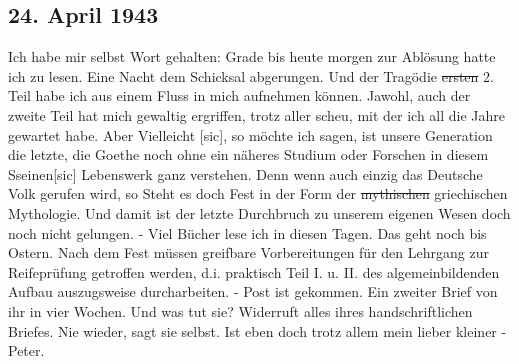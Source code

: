 \subsection{24. April 1943}

Ich habe mir selbst Wort gehalten: Grade bis heute morgen zur Abl\"{o}sung hatte ich zu lesen.
Eine Nacht dem Schicksal abgerungen.
Und der Trag\"{o}die \st{ersten} 2. Teil habe ich aus einem Fluss in mich aufnehmen k\"{o}nnen.
Jawohl, auch der zweite Teil hat mich gewaltig ergriffen, trotz aller scheu, mit der ich all die Jahre gewartet habe.
Aber Vielleicht{\color{red} [sic]}, so m\"{o}chte ich sagen, ist unsere Generation die letzte, die Goethe noch ohne ein n\"{a}heres Studium oder Forschen in diesem Sseinen{\color{red}[sic] } Lebenswerk ganz verstehen.
Denn wenn auch einzig das Deutsche Volk gerufen wird, so Steht es doch Fest in der Form der \st{mythischen} griechischen Mythologie.
Und damit ist der letzte Durchbruch zu unserem eigenen Wesen doch noch nicht gelungen.
- Viel B\"{u}cher lese ich in diesen Tagen.
Das geht noch bis Ostern.
Nach dem Fest m\"{u}ssen greifbare Vorbereitungen f\"{u}r den Lehrgang zur Reifepr\"{u}fung getroffen werden, d.i. praktisch Teil I. u. II. des algemeinbildenden Aufbau auszugsweise durcharbeiten.
- Post ist gekommen.
Ein zweiter Brief von ihr in vier Wochen.
Und was tut sie?
Widerruft alles ihres handschriftlichen Briefes.
Nie wieder, sagt sie selbst.
Ist eben doch trotz allem mein lieber kleiner - Peter.

\clearpage
